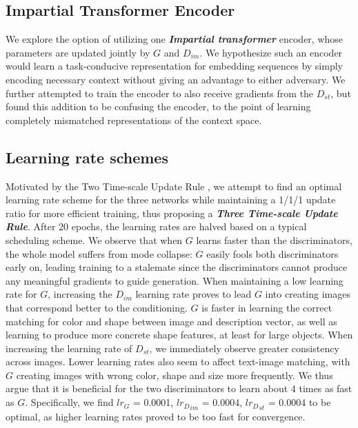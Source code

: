 \documentclass{article}
\begin{document}
\subsection{Impartial Transformer Encoder}
We explore the option of utilizing one \textbf{\textit{Impartial transformer}}  encoder, whose parameters are updated jointly
by $G$ and $D_{im}$. We hypothesize such an encoder would learn a task-conducive representation for embedding sequences by simply encoding necessary context without giving an advantage to either adversary. We further attempted to train the encoder to also receive gradients from the $D_{st}$, but found this addition to be confusing the encoder, to the point of learning completely mismatched representations of the context space. 
\subsection{Learning rate schemes}
Motivated by the Two Time-scale Update Rule \cite{heusel2018ttur}, we attempt to find an optimal learning rate scheme for the three networks while maintaining a 1/1/1 update ratio for more efficient training, thus proposing a \textbf{\textit{Three Time-scale Update Rule}}. 
After 20 epochs, the learning rates are halved based on a typical scheduling scheme.  We observe that when $G$ learns faster than the discriminators, the whole model suffers from mode
collapse: $G$ easily fools both discriminators early on, leading training to a stalemate since the
discriminators cannot produce any meaningful gradients to guide generation. When maintaining a low learning rate for $G$, increasing the $D_{im}$ learning rate proves to lead $G$ into creating images that correspond better to the conditioning. $G$ is faster in learning the correct matching for color and shape between image and description
vector, as well as learning to produce more concrete shape features, at least for large objects.
When increasing the learning rate of $D_{st}$, we immediately observe greater consistency across
images. 
Lower learning rates also seem to affect text-image matching, with
$G$ creating images with wrong color, shape and size more frequently.
We thus argue that it is beneficial for the two discriminators to learn about 4 times as fast as
$G$. Specifically, we find $lr_G$ = 0.0001, ${lr_D}_{im}$ = 0.0004, ${lr_D}_{st}$ = 0.0004 to be optimal, as higher learning rates proved to be too fast for convergence. 
\end{document}
